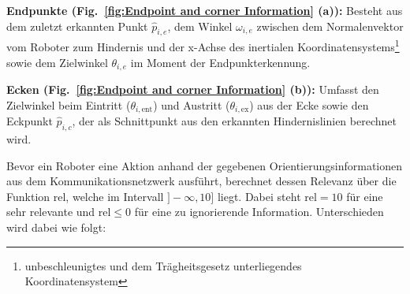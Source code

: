 \documentclass[conference]{IEEEtran}
\begin{document}
\textbf{Endpunkte (Fig.~\ref{fig:Endpoint and corner Information} (a)):} Besteht aus dem zuletzt erkannten Punkt \( \hat{p}_{i,e} \), dem Winkel \( \omega_{i,e} \) 
zwischen dem Normalenvektor vom Roboter zum Hindernis und der x-Achse des inertialen 
Koordinatensystems\footnote{unbeschleunigtes und dem Trägheitsgesetz unterliegendes Koordinatensystem} sowie 
dem Zielwinkel \( \theta_{i,e} \) im Moment der Endpunkterkennung.

\textbf{Ecken (Fig.~\ref{fig:Endpoint and corner Information} (b)):} Umfasst den Zielwinkel beim Eintritt (\( \theta_{i,\mathrm{ent}} \)) und Austritt 
(\( \theta_{i,\mathrm{ex}} \)) aus der Ecke sowie den Eckpunkt \( \hat{p}_{i,c} \), der als Schnittpunkt aus den
erkannten Hindernislinien berechnet wird.

Bevor ein Roboter eine Aktion anhand der gegebenen Orientierungsinformationen aus 
dem Kommunikationsnetzwerk ausführt, berechnet dessen Relevanz über die Funktion \( \mathrm{rel} \), 
welche im Intervall \( ]-\infty, 10] \) liegt. Dabei steht \( \mathrm{rel}=10 \) für eine 
sehr relevante und \( \mathrm{rel} \leq 0 \) für eine zu ignorierende Information. 
Unterschieden wird dabei wie folgt:
\end{document}
